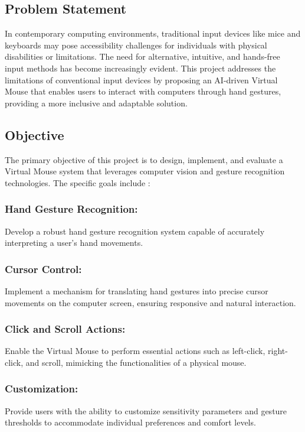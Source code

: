 \documentclass[12pt,a4paper]{report}
\begin{document}
	\subsection{Problem Statement }
	In contemporary computing environments, traditional input devices like mice and keyboards may pose accessibility challenges for individuals with physical disabilities or limitations. The need for alternative, intuitive, and hands-free input methods has become increasingly evident. This project addresses the limitations of conventional input devices by proposing an AI-driven Virtual Mouse that enables users to interact with computers through hand gestures, providing a more inclusive and adaptable solution. 
	\label{Objective}
	\subsection{Objective }
	The primary objective of this project is to design, implement, and evaluate a Virtual Mouse system that leverages computer vision and gesture recognition technologies. The specific goals include : 

 

\subsubsection{{Hand Gesture Recognition:}}Develop a robust hand gesture recognition system capable of accurately interpreting a user's hand movements. \cite{r5}


\subsubsection{{Cursor Control:}}Implement a mechanism for translating hand gestures into precise cursor movements on the computer screen, ensuring responsive and natural interaction. \cite{r6}


\subsubsection{{Click and Scroll Actions:}}Enable the Virtual Mouse to perform essential actions such as left-click, right-click, and scroll, mimicking the functionalities of a physical mouse. \cite{r7}


\subsubsection{{Customization:}}Provide users with the ability to customize sensitivity parameters and gesture thresholds to accommodate individual preferences and comfort levels. \cite{r3,r4}
\end{document}

